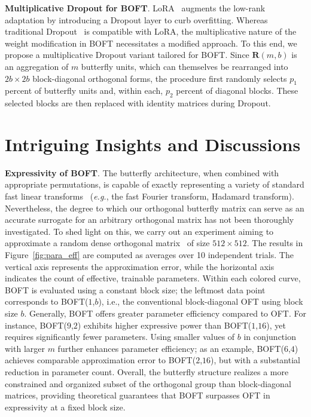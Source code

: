\textbf{Multiplicative Dropout for BOFT}. LoRA~\cite{hulora2022} augments the low-rank adaptation by introducing a Dropout layer to curb overfitting. Whereas traditional Dropout~\cite{srivastava2014dropout} is compatible with LoRA, the multiplicative nature of the weight modification in BOFT necessitates a modified approach. To this end, we propose a multiplicative Dropout variant tailored for BOFT. Since $\bm{R}(m, b)$ is an aggregation of $m$ butterfly units, which can themselves be rearranged into $2b \times 2b$ block-diagonal orthogonal forms, the procedure first randomly selects $p_1$ percent of butterfly units and, within each, $p_2$ percent of diagonal blocks. These selected blocks are then replaced with identity matrices during Dropout.

\section{Intriguing Insights and Discussions}

\textbf{Expressivity of BOFT}. The butterfly architecture, when combined with appropriate permutations, is capable of exactly representing a variety of standard fast linear transforms~\cite{dao2019learning,dao2019kaleidoscope} (\emph{e.g.}, the fast Fourier transform, Hadamard transform). Nevertheless, the degree to which our orthogonal butterfly matrix can serve as an accurate surrogate for an arbitrary orthogonal matrix has not been thoroughly investigated. To shed light on this, we carry out an experiment aiming to approximate a random dense orthogonal matrix~\cite{anderson1987generation} of size $512\times 512$. The results in Figure~\ref{fig:para_eff} are computed as averages over 10 independent trials. The vertical axis represents the approximation error, while the horizontal axis indicates the count of effective, trainable parameters. Within each colored curve, BOFT is evaluated using a constant block size; the leftmost data point corresponds to BOFT($1$,$b$), i.e., the conventional block-diagonal OFT using block size $b$. Generally, BOFT offers greater parameter efficiency compared to OFT. For instance, BOFT($9$,$2$) exhibits higher expressive power than BOFT($1$,$16$), yet requires significantly fewer parameters. Using smaller values of $b$ in conjunction with larger $m$ further enhances parameter efficiency; as an example, BOFT($6$,$4$) achieves comparable approximation error to BOFT($2$,$16$), but with a substantial reduction in parameter count. Overall, the butterfly structure realizes a more constrained and organized subset of the orthogonal group than block-diagonal matrices, providing theoretical guarantees that BOFT surpasses OFT in expressivity at a fixed block size.

